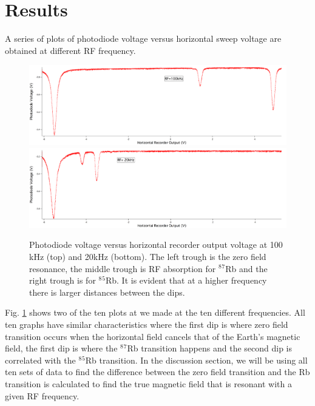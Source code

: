 \documentclass[prb,preprint]{revtex4-1}
\begin{document}
\section{Results}

A series of plots of photodiode voltage versus horizontal sweep voltage are obtained at different RF frequency. \\

\begin{figure}[h!!!!!!!!]
\centering
\includegraphics[width=15cm]{100k.png}
\includegraphics[width=15cm]{20k.png}
\caption{Photodiode voltage versus horizontal recorder output voltage at 100 kHz (top) and 20kHz (bottom). The left trough is the zero field resonance, the middle trough is RF absorption for $^8$$^7$Rb and the right trough is for $^8$$^5$Rb. It is evident that at a higher frequency there is larger  distances between the dips.}
\label{100kHz}
\end{figure}


Fig. \ref{100kHz} shows two of the ten plots at we made at the ten different frequencies. All ten graphs have similar characteristics where the first dip is where zero field transition occurs when the horizontal field cancels that of the Earth's magnetic field, the first dip is where the  $^8$$^7$Rb transition happens and the second dip is correlated with the $^8$$^5$Rb transition. In the discussion section, we will be using all ten sets of data to find the difference between the zero field transition and the Rb transition is calculated to find the true magnetic field that is resonant with a given RF frequency.\\
\end{document}
